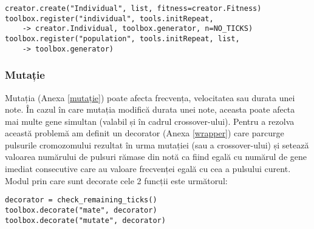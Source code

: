             \begin{verbatim}
creator.create("Individual", list, fitness=creator.Fitness)
toolbox.register("individual", tools.initRepeat, 
    -> creator.Individual, toolbox.generator, n=NO_TICKS)
toolbox.register("population", tools.initRepeat, list, 
    -> toolbox.generator)
            \end{verbatim}
            
        \subsubsection{Mutație} \par
            \noindent Mutația (Anexa \ref{mutație}) poate afecta frecvența, velocitatea sau durata unei note. În cazul în care mutația modifică durata unei note, aceasta poate afecta mai multe gene simultan (valabil și în cadrul crossover-ului). Pentru a rezolva această problemă am definit un decorator (Anexa \ref{wrapper}) care parcurge pulsurile cromozomului rezultat în urma mutației (sau a crossover-ului) și setează valoarea numărului de pulsuri rămase din notă ca fiind egală cu numărul de gene imediat consecutive care au valoare frecvenței egală cu cea a pulsului curent. Modul prin care sunt decorate cele 2 funcții este următorul: 
            
                    \begin{verbatim}
decorator = check_remaining_ticks()
toolbox.decorate("mate", decorator)
toolbox.decorate("mutate", decorator)
                    \end{verbatim}
                    
